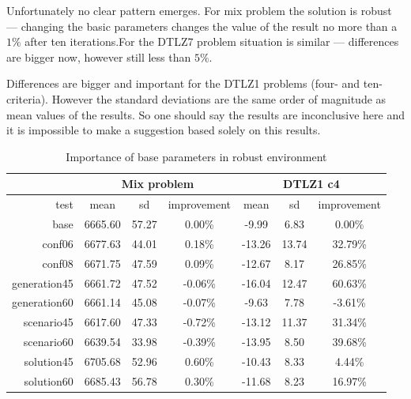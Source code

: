 Unfortunately no clear pattern emerges. For mix problem the solution is robust
--- changing the basic parameters changes the value of the result no more than
a $1\%$ after ten iterations.For the DTLZ7 problem situation is similar ---
differences are bigger now, however still less than $5\%$.

Differences are bigger and important for the DTLZ1 problems (four- and
ten-criteria). However the standard deviations are the same order of magnitude
as mean values of the results. So one should say the results are inconclusive
here and it is impossible to make a suggestion based solely on this results.

\begin{table}
  \centering
  \caption{Importance of base parameters in robust environment}
  \label{t:base2_imp_1}
  \begin{tabular}{r c c c c c c}
    & \multicolumn{3}{c}{Mix problem} & \multicolumn{3}{c}{DTLZ1 c4} \\
    \hline
    test & mean & sd & improvement & mean & sd & improvement \\
    \hline
    \hline
    base & 6665.60 & 57.27 & 0.00\% & -9.99 & 6.83 & 0.00\% \\
    conf06 & 6677.63 & 44.01 & 0.18\% & -13.26 & 13.74 & 32.79\% \\
    conf08 & 6671.75 & 47.59 & 0.09\% & -12.67 & 8.17 & 26.85\% \\
    generation45 & 6661.72 & 47.52 & -0.06\% & -16.04 & 12.47 & 60.63\% \\
    generation60 & 6661.14 & 45.08 & -0.07\% & -9.63 & 7.78 & -3.61\% \\
    scenario45 & 6617.60 & 47.33 & -0.72\% & -13.12 & 11.37 & 31.34\% \\
    scenario60 & 6639.54 & 33.98 & -0.39\% & -13.95 & 8.50 & 39.68\% \\
    solution45 & 6705.68 & 52.96 & 0.60\% & -10.43 & 8.33 & 4.44\% \\
    solution60 & 6685.43 & 56.78 & 0.30\% & -11.68 & 8.23 & 16.97\% \\
    \hline
  \end{tabular}
\end{table}

